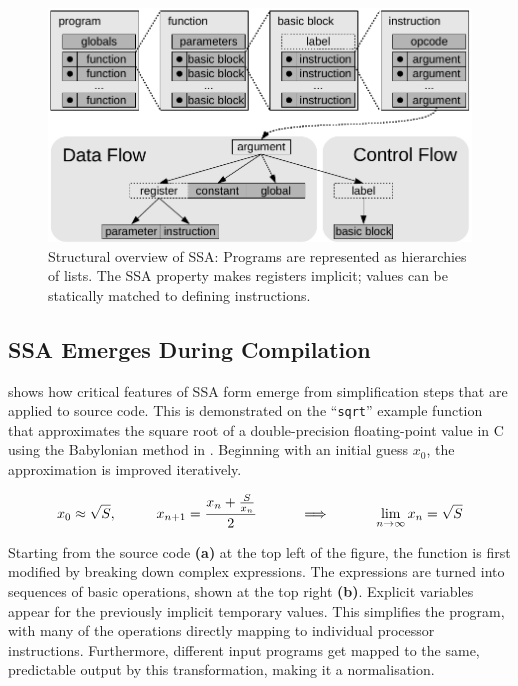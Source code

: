 \begin{figure}[h]
\centering
\includegraphics[width=\textwidth]{figures/ssaoverview}
\caption{Structural overview of SSA: Programs are represented as hierarchies of
    lists. The SSA property makes registers implicit; values can be statically
    matched to defining instructions.}
\label{fig:ssaoverview}
\end{figure}

\subsection{SSA Emerges During Compilation}

     shows how critical features of SSA form emerge from
    simplification steps that are applied to source code.
    This is demonstrated on the ``{\tt sqrt}'' example function that
    approximates the square root of a double-precision floating-point value
    in C using the Babylonian method in .
    Beginning with an initial guess $x_0$, the approximation is improved
    iteratively.

\begin{equation}
    x_0\approx\sqrt{S},\text{\hspace{1cm}}
    x_{n+1}=\frac{x_n+\frac{S}{x_n}}{2}\text{\hspace{1cm}}
    \implies\text{\hspace{1cm}}
    \lim_{n\rightarrow\infty}x_n=\sqrt{S}
    \label{babylonian_equation}
\end{equation}

    Starting from the source code {\bf(a)} at the top left of the figure, the
    function is first modified by breaking down complex expressions.
    The expressions are turned into sequences of basic operations, shown at the
    top right {\bf(b)}.
    Explicit variables appear for the previously implicit temporary values.
    This simplifies the program, with many of the operations directly mapping to
    individual processor instructions.
    Furthermore, different input programs get mapped to the same,
    predictable output by this transformation, making it a normalisation.

